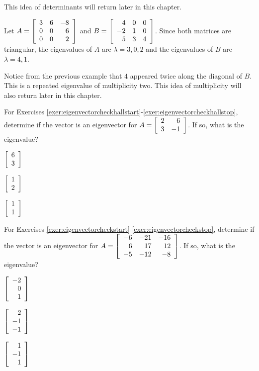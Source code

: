 This idea of determinants will return later in this chapter.\\

\begin{Exam} Let $A = \mtx{rrr}{3&6&-8\\0&0&6\\0&0&2}$ and $B = \mtx{rrr}{4&0&0\\-2&1&0\\5&3&4}$. Since both matrices are triangular, the eigenvalues of $A$ are $\lambda = 3, 0, 2$ and the eigenvalues of $B$ are $\lambda = 4, 1$.
\end{Exam}\vs

Notice from the previous example that $4$ appeared twice along the diagonal of $B$. This is a repeated eigenvalue of multiplicity two. This idea of multiplicity will also return later in this chapter.


\noindent For Exercises \ref{exer:eigenvectorcheckhallstart}-\ref{exer:eigenvectorcheckhallstop}, determine if the vector is an eigenvector for $A = \mtx{rr}{2&6\\3&-1}$. If so, what is the eigenvalue? %
\begin{enumerate}[!HW!, start=1]
\begin{multicols}{3}
\item\label{exer:eigenvectorcheckhallstart} $\vr{6\\3}$
\item $\vr{1\\2}$ 
\item\label{exer:eigenvectorcheckhallstop} $\vr{1\\1}$ 
\end{multicols}
\end{enumerate}

\noindent For Exercises \ref{exer:eigenvectorcheckstart}-\ref{exer:eigenvectorcheckstop}, determine if the vector is an eigenvector for $A = \mtx{rrr}{-6&-21&-16\\6&17&12\\-5&-12&-8}$. If so, what is the eigenvalue?
\begin{enumerate}[!HW!, label=$\spadesuit$ \arabic*., ref=\arabic*]
\begin{multicols}{3}
\item\label{exer:eigenvectorcheckstart} $\vr{-2\\0\\1}$ 
\item $\vr{2\\-1\\-1}$ 
\item\label{exer:eigenvectorcheckstop} $\vr{1\\-1\\1}$
\end{multicols}
\end{enumerate}

